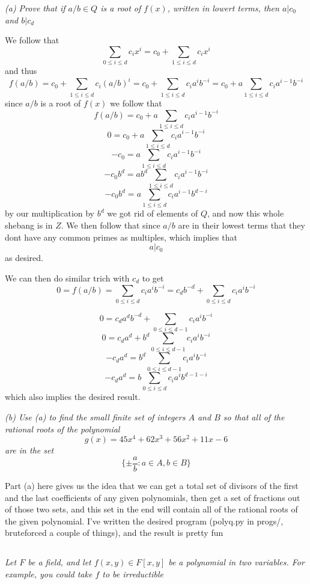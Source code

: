 \documentclass[11pt,oneside,titlepage]{book}
\newcommand{\set}[1]{\{ #1 \}}
\begin{document}
\textit{(a) Prove that if $a/b \in Q$ is a root of $f(x)$, written in
lowert terms, then $a | c_0$ and $b | c_d$}

We follow that
$$\sum_{0 \leq i \leq d}{c_i x^i}  = c_0 + \sum_{1 \leq i \leq d}{c_i x^i} $$
and thus
$$f(a/b) = c_0 + \sum_{1 \leq i \leq d}{c_i (a/b)^i} =
c_0 + \sum_{1 \leq i \leq d}{c_i a^i b^{-i}} = c_0 + a \sum_{1 \leq i
\leq d}{c_i a^{i - 1} b^{-i}}$$ since $a/b$ is a root of $f(x)$ we
follow that
$$f(a/b) = c_0 + a \sum_{1 \leq i \leq d}{c_i a^{i - 1} b^{-i}}$$
$$0 = c_0 + a \sum_{1 \leq i \leq d}{c_i a^{i - 1} b^{-i}}$$
$$-c_0 = a \sum_{1 \leq i \leq d}{c_i a^{i - 1} b^{-i}}$$
$$-c_0 b^d = a b^d \sum_{1 \leq i \leq d}{c_i a^{i - 1} b^{-i}}$$
$$-c_0 b^d = a \sum_{1 \leq i \leq d}{c_i a^{i - 1} b^{d - i}}$$
by our multiplication by $b^d$ we got rid of elements of $Q$, and now
this whole shebang is in $Z$.  We then follow that since $a/b$ are in
their lowest terms that they dont have any common primes as multiples,
which implies that
$$a | c_0$$
as desired.

We can then do similar trich with $c_d$ to get
$$0 = f(a / b) = \sum_{0 \leq i \leq d}{c_i a^i b^{-i}} =
c_d b^{-d} + \sum_{0 \leq i \leq d}{c_i a^i b^{-i}}$$

$$0 = c_d a^d b^{-d} +  \sum_{0 \leq i \leq d - 1}{c_i a^i b^{-i}}$$
$$0 = c_da^d  +  b^d \sum_{0 \leq i \leq d - 1}{c_i a^i b^{-i}}$$
$$-c_da^d =  b^d \sum_{0 \leq i \leq d - 1}{c_i a^i b^{-i}}$$
$$-c_da^d =  b \sum_{0 \leq i \leq d}{c_i a^i b^{d - 1 - i}}$$
which also implies the desired result.

\textit{(b) Use (a) to find the small finite set of integers $A$ and
$B$ so that all of the rational roots of the polynomial
  $$g(x) = 45x^4 + 62x^3 + 56x^2 + 11x - 6$$
  are in the set
  $$\set{\pm \frac a b : a \in A, b \in B}$$}

Part (a) here gives us the idea that we can get a total set of
divisors of the first and the last coefficients of any given
polynomials, then get a set of fractions out of those two sets, and
this set in the end will contain all of the rational roots of the
given polynomial. I've written the desired program (polyq.py in
progs/, bruteforced a couple of things), and the result is pretty fun

\subsection{}

\textit{Let $F$ be a field, and let $f(x, y) \in F[x, y]$ be a
polynomial in two variables. For example, you could take $f$ to be
irreductible}
\end{document}
